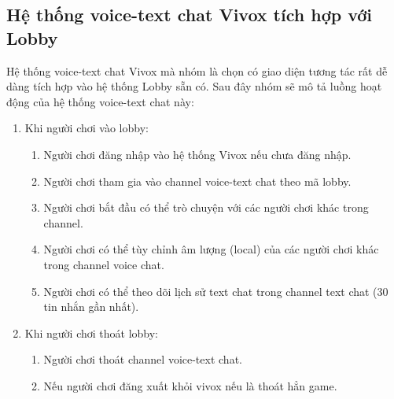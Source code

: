 \subsection{Hệ thống voice-text chat Vivox tích hợp với Lobby}
Hệ thống voice-text chat Vivox mà nhóm là chọn có giao diện tương tác rất dễ dàng tích hợp vào hệ thống Lobby sẵn có. Sau đây nhóm sẽ mô tả luồng hoạt động của hệ thống voice-text chat này:
\begin{enumerate}[$\bullet$]
    \item Khi người chơi vào lobby:
    \begin{enumerate}[-]
        \item Người chơi đăng nhập vào hệ thống Vivox nếu chưa đăng nhập.
        \item Người chơi tham gia vào channel voice-text chat theo mã lobby.
        \item Người chơi bắt đầu có thể trò chuyện với các người chơi khác trong channel.
        \item Người chơi có thể tùy chỉnh âm lượng (local) của các người chơi khác trong channel voice chat.
        \item Người chơi có thể theo dõi lịch sử text chat trong channel text chat (30 tin nhắn gần nhất).
    \end{enumerate}
    \item Khi người chơi thoát lobby:
    \begin{enumerate}[-]
        \item Người chơi thoát channel voice-text chat.
        \item Nếu người chơi đăng xuất khỏi vivox nếu là thoát hẳn game.
    \end{enumerate}
\end{enumerate}